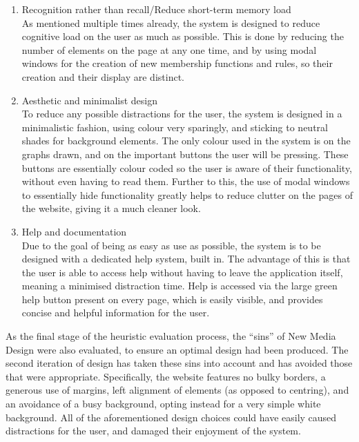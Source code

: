 \begin{enumerate}
\item Recognition rather than recall/Reduce short-term memory load\\
As mentioned multiple times already, the system is designed to reduce cognitive load on the user as much as possible. This is done by reducing the number of elements on the page at any one time, and by using modal windows for the creation of new membership functions and rules, so their creation and their display are distinct.

\item Aesthetic and minimalist design\\
To reduce any possible distractions for the user, the system is designed in a minimalistic fashion, using colour very sparingly, and sticking to neutral shades for background elements. The only colour used in the system is on the graphs drawn, and on the important buttons the user will be pressing. These buttons are essentially colour coded so the user is aware of their functionality, without even having to read them. Further to this, the use of modal windows to essentially hide functionality greatly helps to reduce clutter on the pages of the website, giving it a much cleaner look.

\item Help and documentation\\
Due to the goal of being as easy as use as possible, the system is to be designed with a dedicated help system, built in. The advantage of this is that the user is able to access help without having to leave the application itself, meaning a minimised distraction time. Help is accessed via the large green help button present on every page, which is easily visible, and provides concise and helpful information for the user.

\end{enumerate}
\noindent 
As the final stage of the heuristic evaluation process, the ``sins'' of New Media Design \cite{golombisky2013white} were also evaluated, to ensure an optimal design had been produced. The second iteration of design has taken these sins into account and has avoided those that were appropriate. Specifically, the website features no bulky borders, a generous use of margins, left alignment of elements (as opposed to centring), and an avoidance of a busy background, opting instead for a very simple white background. All of the aforementioned design choices could have easily caused distractions for the user, and damaged their enjoyment of the system.

